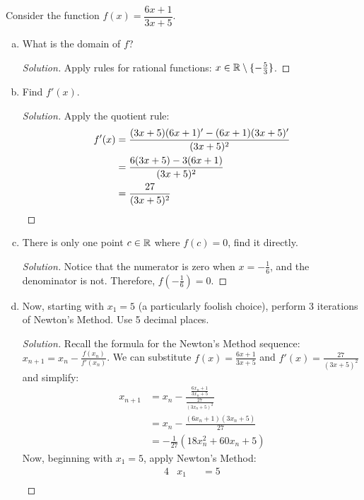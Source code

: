 \documentclass{agony}
\begin{document}
\question Consider the function $f(x)=\dfrac{6x+1}{3x+5}$.
\begin{enumerate}[(a)]
  \item What is the domain of $f$?
        \begin{proof}[Solution]
          Apply rules for rational functions: $x\in\mathbb{R}\setminus\{-\frac53\}$.
        \end{proof}
  \item Find $f'(x)$.
        \begin{proof}[Solution]
          Apply the quotient rule:
          \begin{align*}
            f'(x) & = \frac{(3x+5)(6x+1)'-(6x+1)(3x+5)'}{(3x+5)^2} \\
                  & = \frac{6(3x+5) - 3(6x+1)}{(3x+5)^2}           \\
                  & = \frac{27}{(3x+5)^2} \qedhere
          \end{align*}
        \end{proof}
  \item There is only one point $c\in\mathbb{R}$ where $f(c) = 0$, find it directly.
        \begin{proof}[Solution]
          Notice that the numerator is zero when $x=-\frac16$, and the denominator is not.
          Therefore, $f(-\frac16)=0$.
        \end{proof}
  \item Now, starting with $x_1=5$ (a particularly foolish choice),
        perform 3 iterations of Newton's Method. Use 5 decimal places.
        \begin{proof}[Solution]
          Recall the formula for the Newton's Method sequence: $x_{n+1} = x_n - \frac{f(x_n)}{f'(x_n)}$.
          We can substitute $f(x) = \frac{6x+1}{3x+5}$ and $f'(x)=\frac{27}{(3x+5)^2}$ and simplify:
          \begin{align*}
            x_{n+1} & = x_n - \frac{\frac{6x_n+1}{3x_n+5}}{\frac{27}{(3x_n+5)^2}} \\
                    & = x_n - \frac{(6x_n+1)(3x_n+5)}{27}                         \\
                    & = -\frac{1}{27}(18x_n^2 + 60x_n + 5)
          \end{align*}
          Now, beginning with $x_1=5$, apply Newton's Method:
          \begin{alignat*}{4}
             & x_1 &  & = 5                                                                                                                                      \\

\end{alignat*}
\end{proof}
\end{enumerate}
\end{document}
